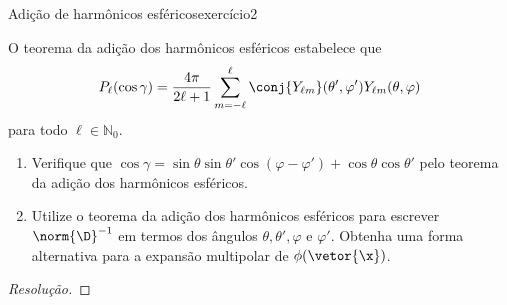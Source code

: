 \begin{exercício}{Adição de harmônicos esféricos}{exercício2}
\begin{center}
    \end{center}
    O teorema da adição dos harmônicos esféricos estabelece que
    \begin{equation*}
        P_\ell(\cos \gamma) = \frac{4\pi}{2\ell + 1} \sum_{m = -\ell}^{\ell} \conj{Y_{\ell m}}(\theta', \varphi')Y_{\ell m}(\theta,\varphi)
    \end{equation*}
    para todo \(\ell \in \mathbb{N}_0\).
    \begin{enumerate}[label=(\alph*)]
        \item Verifique que \(\cos \gamma = \sin\theta \sin\theta' \cos(\varphi - \varphi') + \cos\theta \cos\theta'\) pelo teorema da adição dos harmônicos esféricos.
        \item Utilize o teorema da adição dos harmônicos esféricos para escrever \(\norm{\D}^{-1}\) em termos dos ângulos \(\theta,\theta', \varphi\) e \(\varphi'\). Obtenha uma forma alternativa para a expansão multipolar de \(\phi(\vetor{\x})\).
    \end{enumerate}
\end{exercício}
\begin{proof}[Resolução]
\end{proof}
